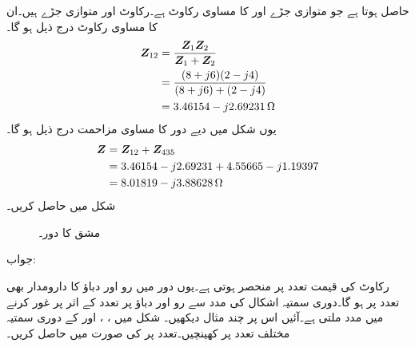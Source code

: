 حاصل ہوتا ہے جو متوازی جڑے  اور  کا مساوی رکاوٹ ہے۔رکاوٹ  اور  متوازی جڑے ہیں۔ان کا مساوی رکاوٹ درج ذیل ہو گا۔
\begin{align*}
{\ensuremath{{\boldsymbol{Z}}}}_{12}&=\frac{{{\boldsymbol{Z}}}_1 {{\boldsymbol{Z}}}_2}{{{\boldsymbol{Z}}}_1+{{\boldsymbol{Z}}}_2}\\
&=\frac{(8+j6)(2-j4)}{(8+j6)+(2-j4)}\\
&=3.46154-j2.69231 \, \si{\ohm}
\end{align*}
یوں شکل  میں دیے دور کا مساوی مزاحمت درج ذیل ہو گا۔
\begin{align*}
{\ensuremath{{\boldsymbol{Z}}}}&={{\boldsymbol{Z}}}_{12}+{{\boldsymbol{Z}}}_{435}\\
&=3.46154-j2.69231+4.55665-j1.19397\\
&=8.01819-j3.88628 \, \si{\ohm}
\end{align*}
شکل  میں  حاصل کریں۔
\begin{figure}
\centering
{}
\caption{مشق  کا دور۔}
\label{شکل_بدلتا_متعدد_متوازی_رکاوٹ_مساوی_الف}
\end{figure}

جواب:

رکاوٹ کی قیمت تعدد پر منحصر ہوتی ہے۔یوں دور میں رو اور دباؤ کا دارومدار بھی تعدد پر ہو گا۔دوری سمتیہ اشکال کی مدد سے رو اور دباؤ پر تعدد کے اثر پر غور کرنے میں مدد ملتی ہے۔آئیں اس پر چند مثال دیکھیں۔
شکل  میں ، ،  اور  کے دوری سمتیہ مختلف تعدد پر  کھینچیں۔تعدد  پر  کی صورت میں  حاصل کریں۔

